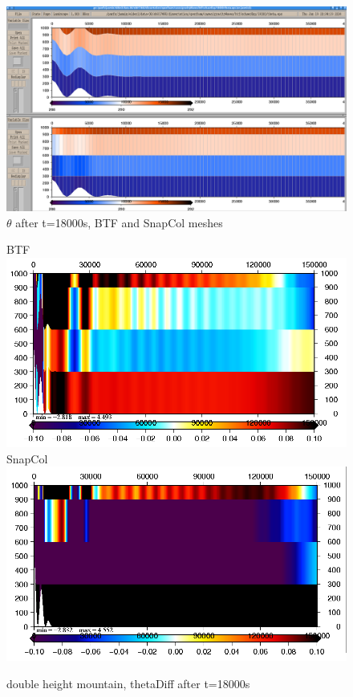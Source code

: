\begin{figure}
	\includegraphics[width=\textwidth]{interim-results/gravityWavesBTFSnapColTheta.png}
	\caption{$\theta$ after t=18000s, BTF and SnapCol meshes}
	\label{fig:gw:theta}
\end{figure}

\begin{figure}
	BTF
	\includegraphics[width=\textwidth]{interim-results/gravityWavesBTFDoubleHeightThetaDiffZoom.png}
	SnapCol
	\includegraphics[width=\textwidth]{interim-results/gravityWavesSnapColDoubleHeightThetaDiffZoom.png}

	\caption{double height mountain, thetaDiff after t=18000s}
	\label{fig:gw:double-height}
\end{figure}

